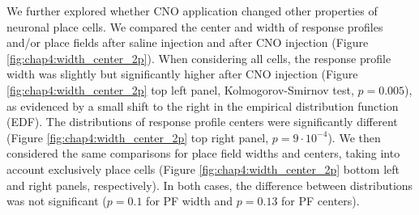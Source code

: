 We further explored whether CNO application changed other properties of neuronal place cells.
We compared the center and width of response profiles and/or place fields after saline injection and after CNO injection (Figure \ref{fig:chap4:width_center_2p}).
When considering all cells, the response profile width was slightly but significantly higher after CNO injection (Figure \ref{fig:chap4:width_center_2p} top left panel, Kolmogorov-Smirnov test, $p=0.005$), as evidenced by a small shift to the right in the empirical distribution function (EDF).
The distributions of response profile centers were significantly different (Figure \ref{fig:chap4:width_center_2p} top right panel, $p=9\cdot 10^{-4}$).
We then considered the same comparisons for place field widths and centers, taking into account exclusively place cells (Figure \ref{fig:chap4:width_center_2p} bottom left and right panels, respectively). 
In both cases, the difference between distributions was not significant ($p=0.1$ for PF width and $p=0.13$ for PF centers). 

